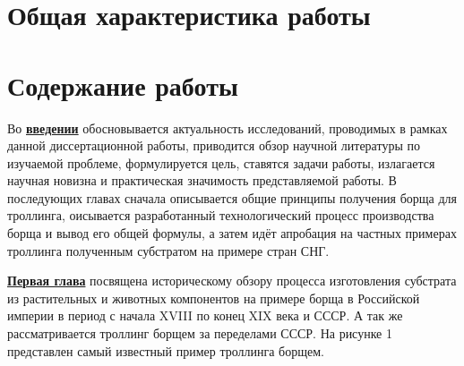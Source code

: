
\section*{Общая характеристика работы}

\newcommand{\actuality}{\underline{\textbf{\actualityTXT}}}
\newcommand{\progress}{\underline{\textbf{\progressTXT}}}
\newcommand{\aim}{\underline{{\textbf\aimTXT}}}
\newcommand{\tasks}{\underline{\textbf{\tasksTXT}}}
\newcommand{\novelty}{\underline{\textbf{\noveltyTXT}}}
\newcommand{\influence}{\underline{\textbf{\influenceTXT}}}
\newcommand{\methods}{\underline{\textbf{\methodsTXT}}}
\newcommand{\defpositions}{\underline{\textbf{\defpositionsTXT}}}
\newcommand{\reliability}{\underline{\textbf{\reliabilityTXT}}}
\newcommand{\probation}{\underline{\textbf{\probationTXT}}}
\newcommand{\contribution}{\underline{\textbf{\contributionTXT}}}
\newcommand{\publications}{\underline{\textbf{\publicationsTXT}}}




\section*{Содержание работы}
Во \underline{\textbf{введении}} обосновывается актуальность
исследований, проводимых в рамках данной диссертационной работы,
приводится обзор научной литературы по изучаемой проблеме,
формулируется цель, ставятся задачи работы, излагается научная новизна
и практическая значимость представляемой работы. В последующих главах
сначала описывается общие принципы получения борща для троллинга, оисывается разработанный технологический процесс производства борща и вывод его общей формулы, а затем идёт апробация на частных примерах троллинга полученным субстратом на примере стран СНГ.

\underline{\textbf{Первая глава}} посвящена историческому обзору процесса изготовления субстрата из растительных и животных компонентов на примере борща в Российской империи в период с начала XVIII по конец XIX века и СССР. А так же рассматривается троллинг борщем за переделами СССР. На рисунке 1 представлен самый известный пример троллинга борщем.

